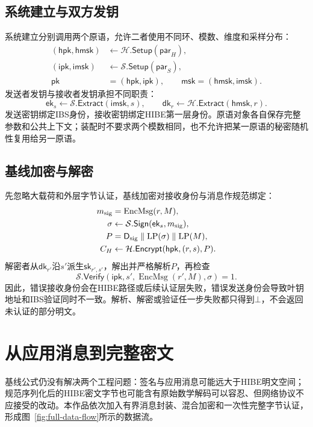 \documentclass[UTF8,a4paper,12pt,oneside,openany,fontset=fandol]{ctexrep}
\begin{document}
\subsection{系统建立与双方发钥}
系统建立分别调用两个原语，允许二者使用不同环、模数、维度和采样分布：
\begin{align*}
 (\mathsf{hpk},\mathsf{hmsk})&\leftarrow\mathcal H.\mathsf{Setup}(\mathsf{par}_{H}),\\
 (\mathsf{ipk},\mathsf{imsk})&\leftarrow\mathcal S.\mathsf{Setup}(\mathsf{par}_{S}),\\
 \mathsf{pk}&=(\mathsf{hpk},\mathsf{ipk}),\qquad
 \mathsf{msk}=(\mathsf{hmsk},\mathsf{imsk}).
\end{align*}
发送者发钥与接收者发钥承担不同职责：
\[
 \mathsf{ek}_s\leftarrow\mathcal S.\mathsf{Extract}(\mathsf{imsk},s),\qquad
 \mathsf{dk}_r\leftarrow\mathcal H.\mathsf{Extract}(\mathsf{hmsk},r).
\]
发送密钥绑定IBS身份，接收密钥绑定HIBE第一层身份。原语对象各自保存完整参数和公共上下文；装配时不要求两个模数相同，也不允许把某一原语的秘密随机性复用给另一原语。

\subsection{基线加密与解密}
先忽略大载荷和外层字节认证，基线加密对接收身份与消息作规范绑定：
\begin{align*}
 m_{\rm sig}&=\operatorname{EncMsg}(r,M),\\
 \sigma&\leftarrow\mathcal S.\mathsf{Sign}(\mathsf{ek}_s,m_{\rm sig}),\\
 P&=\mathsf D_{\rm sig}\parallel\mathrm{LP}(\sigma)\parallel\mathrm{LP}(M),\\
 C_H&\leftarrow\mathcal H.\mathsf{Encrypt}(\mathsf{hpk},(r,s),P).
\end{align*}
解密者从\(\mathsf{dk}_{r'}\)沿\(s'\)派生\(\mathsf{sk}_{r',s'}\)，解出并严格解析\(P\)，再检查
\[
 \mathcal S.\mathsf{Verify}
   (\mathsf{ipk},s',\operatorname{EncMsg}(r',M),\sigma)=1.
\]
因此，错误接收身份会在HIBE路径或后续认证层失败，错误发送身份会导致叶钥地址和IBS验证同时不一致。解析、解密或验证任一步失败都只得到\(\bot\)，不会返回未认证的部分明文。

\section{从应用消息到完整密文}
基线公式仍没有解决两个工程问题：签名与应用消息可能远大于HIBE明文空间；规范序列化后的HIBE密文字节也可能含有原始数学解码可以容忍、但网络协议不应接受的改动。本作品依次加入有界消息封装、混合加密和一次性完整字节认证，形成图~\ref{fig:full-data-flow}所示的数据流。
\end{document}
